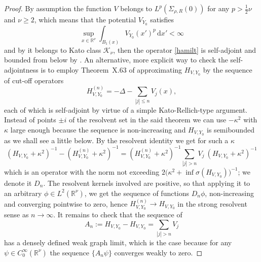\documentclass{article}
\numberwithin{equation}{section}
\theoremstyle{definition}
\newcommand{\D}{\mathrm{d}}
\newcommand{\R}{\mathbb{R}}
\newcommand{\KK}{\mathcal{K}}
\begin{document}
\begin{proof}
By assumption the function $V$ belongs to $L^p(\Sigma_{\rho,R}(0))$ for any $p>\frac12\nu$ and $\nu\ge 2$, which means that the potential $V_{Y_0}$ satisfies
\begin{equation*}
\sup_{x\in\R^\nu} \int_{B_1(x)} V_{Y_0}(x')^p\,\D x' < \infty
\end{equation*}
and by \cite[Prop.~4.3]{AS82} it belongs to Kato class $\KK_\nu$, then the operator \eqref{hamilt} is self-adjoint and bounded from below by \cite[Thm.~A.2.7]{Si82}. An alternative, more explicit way to check the self-adjointness is to employ Theorem~X.63 of \cite{RS} approximating $H_{V,Y_0}$ by the sequence of cut-off operators
\begin{equation*}
H_{V,Y_0}^{(n)} = -\Delta - \sum_{|j|\le n} V_j(x),
\end{equation*}
each of which is self-adjoint by virtue of a simple Kato-Rellich-type argument. Instead of points $\pm i$ of the resolvent set in the said theorem we can use $-\kappa^2$ with $\kappa$ large enough because the sequence is non-increasing and $H_{V,Y_0}$ is semibounded as we shall see a little below. By the resolvent identity we get for such a $\kappa$
\begin{equation*}
(H_{V,Y_0}+\kappa^2)^{-1} - (H_{V,Y_0}^{(n)}+\kappa^2)^{-1} = (H_{V,Y_0}^{(n)}+\kappa^2)^{-1}\sum_{|j|>n} V_j\: (H_{V,Y_0}+\kappa^2)^{-1}
\end{equation*}
which is an operator with the norm not exceeding $2\big(\kappa^2+\inf\sigma(H_{V,Y_0})\big)^{-1}$; we denote it $D_n$. The resolvent kernels involved are positive, so that applying it to an arbitrary $\phi\in L^2(\R^\nu)$, we get the sequence of functions $D_n\phi$, non-increasing and converging pointwise to zero, hence $H_{V,Y_0}^{(n)} \to H_{V,Y_0}$ in the strong resolvent sense as $n\to\infty$. It remains to check that the sequence of
\begin{equation*}
A_n:= H_{V,Y_0} - H_{V,Y_0} = \sum_{|j|>n} V_j
\end{equation*}
has a densely defined weak graph limit, which is the case because for any $\psi\in C_0^\infty(\R^\nu)$ the sequence $\{A_n\psi\}$ converges weakly to zero.


\end{proof}
\end{document}
